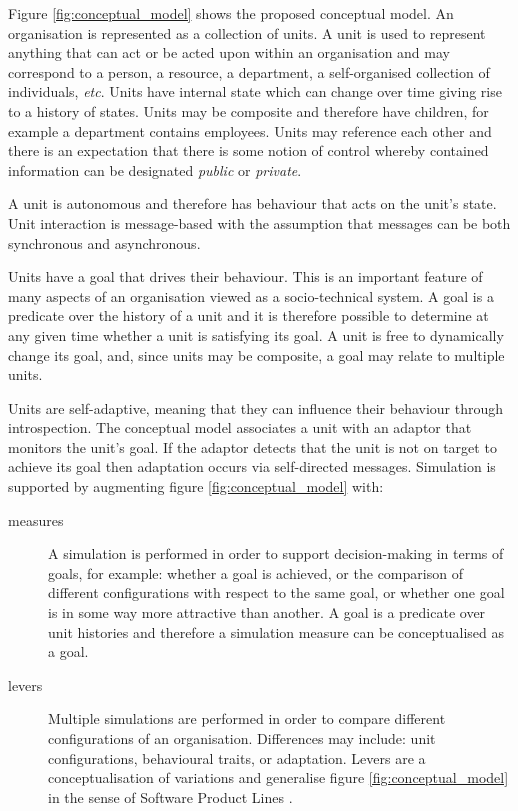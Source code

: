 \documentclass[10pt,numbers]{sigplanconf}
\begin{document}
Figure \ref{fig:conceptual_model} shows the proposed conceptual model. An organisation is represented as a collection of units. A unit is used to represent anything that can act or be acted upon within an organisation and may correspond to a person, a resource, a department, a self-organised collection of individuals, {\it etc}. Units have internal state which can change over time giving rise to a history of states. Units may be composite and therefore have children, for example a department contains employees. Units may reference each other and there is an expectation that there is some notion of control whereby contained information can be designated {\it public} or {\it private}.

A unit is autonomous and therefore has behaviour that acts on the unit's state. Unit interaction is message-based with the assumption that messages can be both synchronous and asynchronous.

Units have a goal that drives their behaviour. This is an important feature of many aspects of an organisation viewed as a socio-technical system. A goal is a predicate over the history of a unit and it is therefore possible to determine at any given time whether a unit is satisfying its goal. A unit is free to dynamically change its goal, and, since units may be composite, a goal may relate to multiple units.

Units are self-adaptive, meaning that they can influence their behaviour through introspection. The conceptual model associates a unit with an adaptor that monitors the unit's goal. If the adaptor detects that the unit is not on target to achieve its goal then adaptation occurs via self-directed messages.
%
Simulation is supported by augmenting figure \ref{fig:conceptual_model} with:
\begin{description}
\item[measures]
A simulation is performed in order to support decision-making in terms of goals, for example: whether a goal is achieved, or the comparison of different configurations with respect to the same goal, or whether one goal is in some way more attractive than another. A goal is a predicate over unit histories and therefore a simulation measure can be conceptualised as a goal.
\item[levers]
 Multiple simulations are performed in order to compare different configurations of an organisation. Differences may include: unit configurations, behavioural traits, or adaptation. Levers are a conceptualisation of variations and generalise figure \ref{fig:conceptual_model} in the sense of Software Product Lines \cite{DBLP:books/daglib/0032299}.
\end{description}
\end{document}
